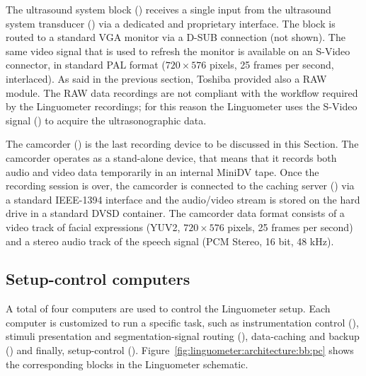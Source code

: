 The ultrasound system block () receives a single input from the
ultrasound system transducer () via a dedicated and proprietary
interface. The  block is routed to a standard VGA monitor via a D-SUB
connection (not shown). 
The same video signal that is used to refresh the monitor is available on
an S-Video connector, in standard PAL format ($720\times576$ pixels, 25 frames
per second, interlaced).
As said in the previous section, Toshiba provided also a RAW module. 
The RAW data recordings are not compliant with the workflow required by the
Linguometer recordings; for this reason the Linguometer uses the S-Video
signal () to acquire the 
ultrasonographic data.

The camcorder () is the last recording device to be discussed in this
Section.
The camcorder operates as a stand-alone device, that means that it records
both audio and video data temporarily in an internal MiniDV tape.
Once the recording session is over, the camcorder is connected to the caching
server () via a standard IEEE-1394 interface and the audio/video
stream is stored on the hard drive in a standard DVSD container.
The camcorder data format consists of a video track of facial expressions (YUV2,
$720\times576$ pixels, 25 frames per second) and a stereo audio track 
of the speech signal (PCM Stereo, 16 bit, 48 kHz).
\subsection{Setup-control computers}
A total of four computers are used to control the Linguometer setup.
Each computer is customized to run a specific task, such as instrumentation 
control (), stimuli presentation and segmentation-signal routing 
(), data-caching and backup () and finally, setup-control 
().
Figure~\ref{fig:linguometer:architecture:bb:pc} shows the corresponding blocks
in the Linguometer schematic.


